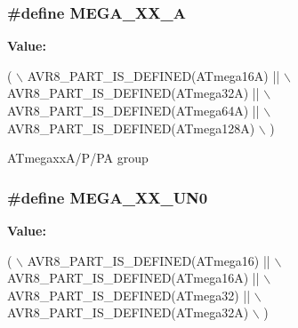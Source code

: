 \subsubsection[{M\+E\+G\+A\+\_\+\+X\+X\+\_\+\+A}]{\setlength{\rightskip}{0pt plus 5cm}\#define M\+E\+G\+A\+\_\+\+X\+X\+\_\+\+A}\label{group__mega__part__macros__group_ga2b23bf35c1439ec05ddac769a8d8d1f8}
{\bfseries Value\+:}
\begin{DoxyCode}
( \(\backslash\)
        AVR8\_PART\_IS\_DEFINED(ATmega16A)  || \(\backslash\)
        AVR8\_PART\_IS\_DEFINED(ATmega32A)  || \(\backslash\)
        AVR8\_PART\_IS\_DEFINED(ATmega64A)  || \(\backslash\)
        AVR8\_PART\_IS\_DEFINED(ATmega128A) \(\backslash\)
        )
\end{DoxyCode}
A\+Tmegaxx\+A/\+P/\+P\+A group \hypertarget{group__mega__part__macros__group_gae1703e1537f2cbb10b4a8992c8b7b70b}{}
\subsubsection[{M\+E\+G\+A\+\_\+\+X\+X\+\_\+\+U\+N0}]{\setlength{\rightskip}{0pt plus 5cm}\#define M\+E\+G\+A\+\_\+\+X\+X\+\_\+\+U\+N0}\label{group__mega__part__macros__group_gae1703e1537f2cbb10b4a8992c8b7b70b}
{\bfseries Value\+:}
\begin{DoxyCode}
( \(\backslash\)
        AVR8\_PART\_IS\_DEFINED(ATmega16)    || \(\backslash\)
        AVR8\_PART\_IS\_DEFINED(ATmega16A)   || \(\backslash\)
        AVR8\_PART\_IS\_DEFINED(ATmega32)    || \(\backslash\)
        AVR8\_PART\_IS\_DEFINED(ATmega32A) \(\backslash\)
        )
\end{DoxyCode}
\hypertarget{group__mega__part__macros__group_gaad35e34280ef078dec0cc18c3ea6d3f6}{}
